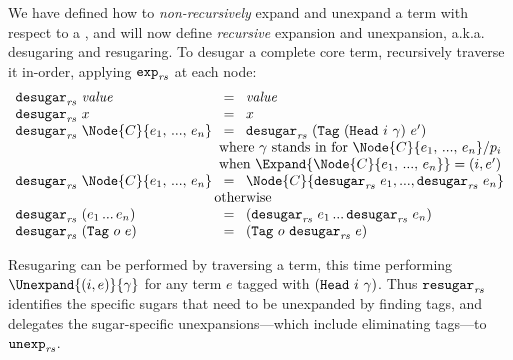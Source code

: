 We have defined how to \emph{non-recursively} expand and unexpand a term
with respect to a {}, and will now define \emph{recursive}
expansion and unexpansion, a.k.a. desugaring and resugaring.
To desugar a complete core term,
recursively traverse it in-order,
applying $\texttt{exp}_{\mathit{rs}}$ at each node:
\[\begin{array}{lcl}
\ExpandRec{\Value} \!&=&\! \Value \\
\ExpandRec{\VarX} \!&=&\! \VarX \\
\ExpandRec{\Node{C}{e_1,\,...,\,e_n}} \!&=&\!
  \ExpandRec{\Tag{\MacHead{i}{\gamma}}{e'}} \\
  & \multicolumn{2}{l}{\text{
\hspace{-1em} where $\gamma$ stands in for $\Node{C}{e_1,\,...,\,e_n} \match p_i$}} \\
  & \multicolumn{2}{l}{\text{
\hspace{-1em} when $\Expand{\Node{C}{e_1,\,...,\,e_n}} = (i, e')$}} \\
\ExpandRec{\Node{C}{e_1,\,...,\,e_n}} \!&=&\!
  \Node{C}{\ExpandRec{e_1},...,\ExpandRec{e_n}} \\
& \multicolumn{2}{l}{\text{\hspace{-1em} otherwise}} \\
\ExpandRec{(e_1\,...\,e_n)} \!&=&\!
  (\ExpandRec{e_1}\,...\,\ExpandRec{e_n}) \\
\ExpandRec{\Tag{o}{e}} \!&=&\!
  \Tag{o}{\ExpandRec{e}}
\end{array}\]

Resugaring can be performed by traversing a term, this
time performing $\Unexpand{(i, e)}{\gamma}$ for any term $e$ tagged with
$(\texttt{Head}\ i\ \gamma)$. Thus $\texttt{resugar}_{\mathit{rs}}$ identifies the specific sugars
that need to be unexpanded by finding {\MacHeadf} tags, and delegates the
sugar-specific unexpansions---which include eliminating {\MacBodyf}
tags---to $\texttt{unexp}_{\mathit{rs}}$.

